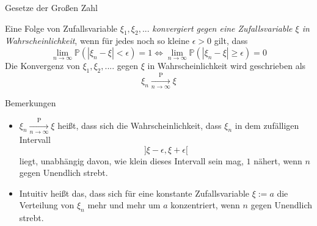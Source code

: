 \documentclass[
  8pt,
  ignorenonframetext,
]{beamer}
\providecommand{\tightlist}{%
  \setlength{\itemsep}{0pt}\setlength{\parskip}{0pt}}
\begin{document}
\begin{frame}{Gesetze der Großen Zahl}
\protect\hypertarget{gesetze-der-grouxdfen-zahl-1}{}
\small
\begin{definition}
\justifying
Eine Folge von Zufallsvariable $\xi_1,\xi_2,...$ \textit{konvergiert gegen eine Zufallsvariable $\xi$ in Wahrscheinlichkeit}, wenn für jedes noch so kleine $\epsilon > 0$ gilt, dass
\begin{equation}
\lim_{n \to \infty} \mathbb{P}(|\xi_n - \xi| < \epsilon)    = 1 \Leftrightarrow
\lim_{n \to \infty} \mathbb{P}(|\xi_n - \xi| \ge \epsilon)  = 0
\end{equation}
Die Konvergenz von $\xi_1,\xi_2,....$ gegen $\xi$ in Wahrscheinlichkeit wird geschrieben als
\begin{equation}
\xi_n\xrightarrow[n \to \infty]{\mbox{P}} \xi
\end{equation}
\end{definition}

\footnotesize

Bemerkungen

\begin{itemize}
\tightlist
\item
  \(\xi_n\xrightarrow[n \to \infty]{\text{P}} \xi\) heißt, dass sich die
  Wahrscheinlichkeit, dass \(\xi_n\) in dem zufälligen Intervall
  \begin{equation}
  ]\xi-\epsilon, \xi+\epsilon[
  \end{equation} liegt, unabhängig davon, wie klein dieses Intervall
  sein mag, \(1\) nähert, wenn \(n\) gegen Unendlich strebt.
\item
  Intuitiv heißt das, dass sich für eine konstante Zufallsvariable
  \(\xi := a\) die Verteilung von \(\xi_n\) mehr und mehr um \(a\)
  konzentriert, wenn \(n\) gegen Unendlich strebt.
\end{itemize}
\end{frame}
\end{document}
